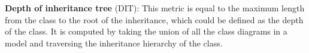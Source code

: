 

\textbf{Depth of inheritance tree} (DIT): This metric is equal to the maximum length from the class to the root of the inheritance, which could be defined as the depth of the class. It is computed by taking the union of all the class diagrams in a \umlS model and traversing the inheritance hierarchy of the class.

%

